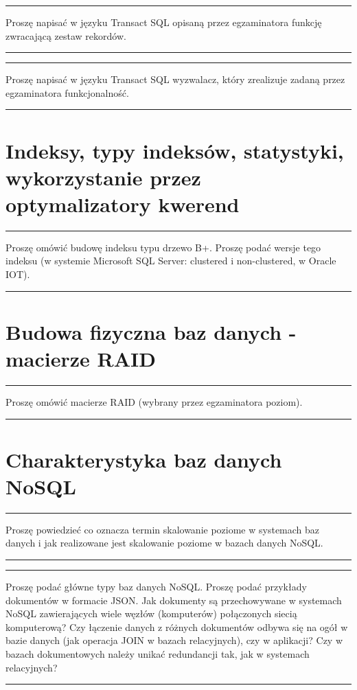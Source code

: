 \documentclass[a5paper,6pt]{article}
\newcommand{\horrule}[1]{\rule{\linewidth}{#1}}
\begin{document}
    \horrule{0.5pt}
    Proszę napisać w języku Transact SQL opisaną przez egzaminatora funkcję zwracającą zestaw rekordów.\\
    \horrule{0.5pt}

    \horrule{0.5pt}
    Proszę napisać w języku Transact SQL wyzwalacz, który zrealizuje zadaną
    przez egzaminatora funkcjonalność.\\
    \horrule{0.5pt}


    \section{Indeksy, typy indeksów, statystyki, wykorzystanie przez
             optymalizatory kwerend} %
    \label{sec:indeksy}

    \horrule{0.5pt}
    Proszę omówić budowę indeksu typu drzewo B+. Proszę podać wersje tego
    indeksu (w systemie Microsoft SQL Server: clustered i non-clustered, w
    Oracle IOT).\\
    \horrule{0.5pt}


    \section{Budowa fizyczna baz danych - macierze RAID} %
    \label{sec:budowa_fizyczna_baz_danych_macierze_raid}

    \horrule{0.5pt}
    Proszę omówić macierze RAID (wybrany przez egzaminatora poziom).\\
    \horrule{0.5pt}


    \section{Charakterystyka baz danych NoSQL} %
    \label{sec:charakterystyka_baz_danych_nosql}

    \horrule{0.5pt}
    Proszę powiedzieć co oznacza termin skalowanie poziome w systemach baz
    danych i jak realizowane jest skalowanie poziome w bazach danych NoSQL.\\
    \horrule{0.5pt}

    \horrule{0.5pt}
    Proszę podać główne typy baz danych NoSQL. Proszę podać przykłady dokumentów
    w formacie JSON. Jak dokumenty są przechowywane w systemach NoSQL
    zawierających wiele węzłów (komputerów) połączonych siecią komputerową?
    Czy łączenie danych z różnych dokumentów odbywa się na ogół w bazie danych
    (jak operacja JOIN w bazach relacyjnych), czy w aplikacji? Czy w bazach
    dokumentowych należy unikać redundancji tak, jak w systemach relacyjnych?\\
    \horrule{0.5pt}

\end{document}
